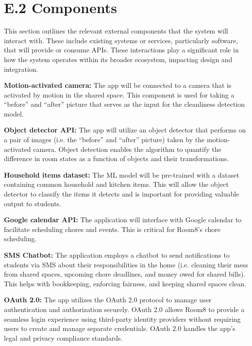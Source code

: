 \documentclass{scrreprt}
\newcommand*{\nsection}[1]{
    \section*{#1}
    \addcontentsline{toc}{section}{#1}
}
\theoremstyle{definition}
\begin{document}
\nsection{E.2 Components}
This section outlines the relevant external components that the system will interact with. These include existing systems or services, particularly software, that will provide or consume APIs. These interactions play a significant role in how the system operates within its broader ecosystem, impacting design and integration.
\begin{flushleft}
  \item \textbf{Motion-activated camera:} The app will be connected to a camera that is activated by motion in the shared space. This component is used for taking a “before” and “after” picture that serves as the input for the cleanliness detection model. \newline
  
  \item \textbf{Object detector API:} The app will utilize an object detector that performs on a pair of images (i.e. the “before” and “after” picture) taken by the motion-activated camera. Object detection enables the algorithm to quantify the difference in room states as a function of objects and their transformations.\newline 
  
  \item \textbf{Household items dataset:} The ML model will be pre-trained with a dataset containing common household and kitchen items. This will allow the object detector to classify the items it detects and is important for providing valuable output to students.\newline
   
  \item \textbf{Google calendar API:} The application will interface with Google calendar to facilitate scheduling chores and events. This is critical for Room8's chore scheduling.\newline

  \item \textbf{SMS Chatbot:} The application employs a chatbot to send notifications to students via SMS about their responsibilities in the home (i.e. cleaning their mess from shared spaces, upcoming chore deadlines, and money owed for shared bills). This helps with bookkeeping, enforcing fairness, and keeping shared spaces clean.\newline

  \item \textbf{OAuth 2.0:} The app utilizes the OAuth 2.0 protocol to manage user authentication and authorization securely. OAuth 2.0 allows Room8 to provide a seamless login experience using third-party identity providers without requiring users to create and manage separate credentials. OAuth 2.0 handles the app’s legal and privacy compliance standards.\newline
  

\end{flushleft}
\end{document}
